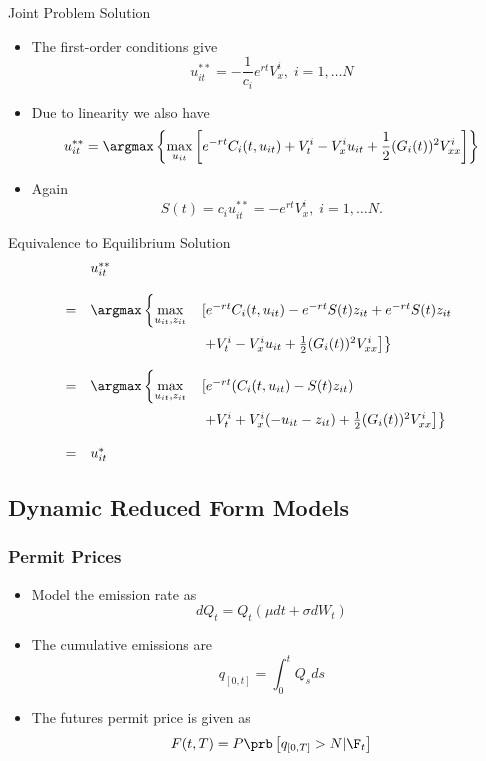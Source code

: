 {Joint Problem Solution}
\begin{itemize}
\item<1-> The first-order conditions give
$$
u_{it}^{**}= -\frac{1}{c_i} e^{rt} V^i_x, \; i=1, \ldots N
$$
\item<2-> Due to linearity we also have
$$
u_{it}^{**}= \argmax \left\{ \max_{u_{it}} \left[e^{-rt} C_i(t,u_{it}) + V^i_t -V_x^iu_{it} + \frac{1}{2}(G_i(t))^2 V^i_{xx}\right]
\right\}
$$
\item<3-> Again
$$
S(t) = c_i u_{it}^{**}= -e^{rt}V^i_x, \; i=1, \ldots N.
$$
\end{itemize}



{Equivalence to Equilibrium Solution}
$$
\begin{array}{lll}
&u_{it}^{**}&\\*[12pt]
=&  \argmax \left\{ \displaystyle \max_{u_{it},z_{it}} \right. &\left[e^{-rt} C_i(t,u_{it}) -e^{-rt}S(t)z_{it} +e^{-rt}S(t)z_{it} \right.\\*[12pt]
 &&\left.\left. + V^i_t -V_x^iu_{it} + \frac{1}{2}(G_i(t))^2 V^i_{xx}\right]
\right\}\\*[12pt]
=&  \argmax \left\{ \displaystyle \max_{u_{it},z_{it}} \right. &\left[e^{-rt} (C_i(t,u_{it}) -S(t)z_{it}) \right. \\*[12pt]
&&\left.\left. + V^i_t +V_x^i(-u_{it}-z_{it}) + \frac{1}{2}(G_i(t))^2 V^i_{xx}\right]
\right\}\\*[12pt]
=&u_{it}^*&
\end{array}
$$



\subsection{Dynamic Reduced Form Models}
\begin{frame}
\frametitle{Permit Prices}
\begin{itemize}
\item<1-> Model  the emission rate as
$$
dQ_t = Q_t(\mu dt + \sigma dW_t)
$$
\item<2->
The cumulative emissions are
$$
q_{[0,t]} = \int_0^t Q_s ds
$$
\item<3->
The futures permit price is given as
$$
F(t,T) = P \prb\left[q_{[0,T]}>N |\F_t\right]
$$
\end{itemize}
\end{frame}

